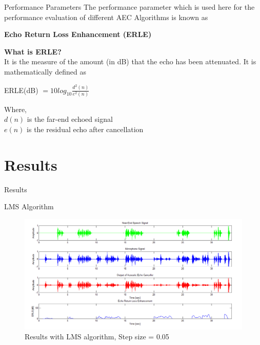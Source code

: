 \documentclass[xcolor=dvipsnames]{beamer}
\begin{document}
\begin{frame}{Performance Parameters}
The performance parameter which is used here for the performance evaluation of different AEC Algorithms is known as \\ 
	\begin{center}
	\textbf{Echo Return Loss Enhancement (ERLE)}
	\end{center}

\textbf{What is ERLE?}\\
It is the measure of the amount (in dB) that the echo has been attenuated. It is mathematically defined as \\
	\begin{center}
	ERLE(dB) $= 10log_{10}{\frac{d^2(n)}{e^2(n)}}$
	\end{center}
Where,\\
$d(n)$ is the far-end echoed signal \\
$e(n)$ is the residual echo after cancellation
\end{frame}

\section{Results}
\begin{frame}{}
\begin{center}
\Huge Results
\end{center}
\end{frame}

\begin{frame}{LMS Algorithm}
	\begin{figure}
		\includegraphics[width=\textwidth]{LMS_Result_5e-2}
		\caption{Results with LMS algorithm, Step size = 0.05}
	\end{figure}
\end{frame}
\end{document}
